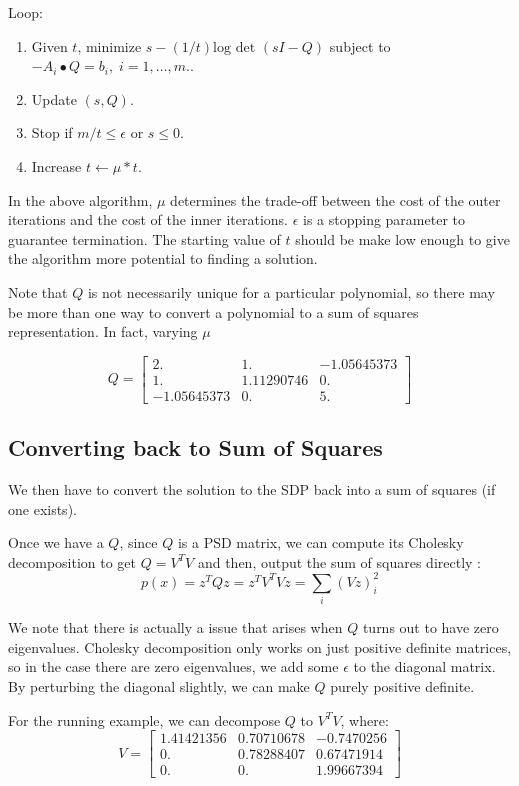 \documentclass{article}
\begin{document}
\par                  Loop:
		\begin{enumerate}[\hspace{1cm} 1.]
		\item Given $t$, minimize $s - (1/t)\text{log }\text{det } (sI - Q)$ subject to $ - A_i \bullet Q = b_i, \; i = 1, \ldots, m. $. 
		\item Update $(s,Q)$.
		\item Stop if $m/t \leq \epsilon$ or $s \leq 0$. 
		\item Increase $t  \leftarrow \mu*t$.
		\end{enumerate} 

In the above algorithm, $\mu$ determines the trade-off between the cost of the outer iterations and the cost of the inner iterations. $\epsilon$ is a stopping parameter to guarantee termination. The starting value of $t$ should be make low enough to give the algorithm more potential to finding a solution.

Note that $Q$ is not necessarily unique for a particular polynomial, so there may be more than one way to convert a polynomial to a sum of squares representation. In fact, varying $\mu$

\[Q = \begin{bmatrix}
2.   &       1.    &     -1.05645373 \\
1.   &       1.11290746 & 0.        \\
-1.05645373 & 0.     &     5.        
\end{bmatrix}
\]

\subsection{Converting back to Sum of Squares}
We then have to convert the solution to the SDP back into a sum of squares (if one exists).

Once we have a $Q$, since $Q$ is a PSD matrix, we can compute its Cholesky
decomposition to get $Q = V^TV$ and then, output the sum of squares
directly \cite{sos_convex}: $$p(x) = z^TQz = z^TV^TVz = \sum_i (Vz)_i^2$$

We note that there is actually a issue that arises when $Q$ turns out to have zero eigenvalues. Cholesky decomposition only works on just positive definite matrices, so in the case there are zero eigenvalues, we add some $\epsilon$ to the diagonal matrix. By perturbing the diagonal slightly, we can make $Q$ purely positive definite.

For the running example, we can decompose $Q$ to $V^TV$, where:
\[V = \begin{bmatrix}
1.41421356 & 0.70710678 & -0.7470256 \\
0.         & 0.78288407 &  0.67471914 \\
0.         & 0.         &  1.99667394 
\end{bmatrix}\]
\end{document}
